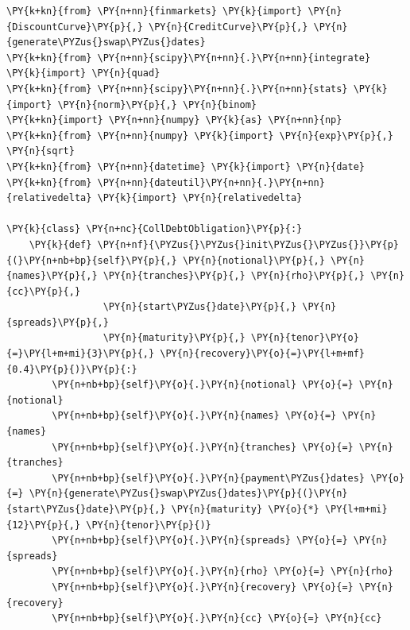 \begin{codebox}
\begin{Verbatim}[commandchars=\\\{\}]
\PY{k+kn}{from} \PY{n+nn}{finmarkets} \PY{k}{import} \PY{n}{DiscountCurve}\PY{p}{,} \PY{n}{CreditCurve}\PY{p}{,} \PY{n}{generate\PYZus{}swap\PYZus{}dates}
\PY{k+kn}{from} \PY{n+nn}{scipy}\PY{n+nn}{.}\PY{n+nn}{integrate} \PY{k}{import} \PY{n}{quad}
\PY{k+kn}{from} \PY{n+nn}{scipy}\PY{n+nn}{.}\PY{n+nn}{stats} \PY{k}{import} \PY{n}{norm}\PY{p}{,} \PY{n}{binom}
\PY{k+kn}{import} \PY{n+nn}{numpy} \PY{k}{as} \PY{n+nn}{np}
\PY{k+kn}{from} \PY{n+nn}{numpy} \PY{k}{import} \PY{n}{exp}\PY{p}{,} \PY{n}{sqrt}
\PY{k+kn}{from} \PY{n+nn}{datetime} \PY{k}{import} \PY{n}{date}
\PY{k+kn}{from} \PY{n+nn}{dateutil}\PY{n+nn}{.}\PY{n+nn}{relativedelta} \PY{k}{import} \PY{n}{relativedelta}
	
\PY{k}{class} \PY{n+nc}{CollDebtObligation}\PY{p}{:}
    \PY{k}{def} \PY{n+nf}{\PYZus{}\PYZus{}init\PYZus{}\PYZus{}}\PY{p}{(}\PY{n+nb+bp}{self}\PY{p}{,} \PY{n}{notional}\PY{p}{,} \PY{n}{names}\PY{p}{,} \PY{n}{tranches}\PY{p}{,} \PY{n}{rho}\PY{p}{,} \PY{n}{cc}\PY{p}{,}
                 \PY{n}{start\PYZus{}date}\PY{p}{,} \PY{n}{spreads}\PY{p}{,}
                 \PY{n}{maturity}\PY{p}{,} \PY{n}{tenor}\PY{o}{=}\PY{l+m+mi}{3}\PY{p}{,} \PY{n}{recovery}\PY{o}{=}\PY{l+m+mf}{0.4}\PY{p}{)}\PY{p}{:}
        \PY{n+nb+bp}{self}\PY{o}{.}\PY{n}{notional} \PY{o}{=} \PY{n}{notional}
        \PY{n+nb+bp}{self}\PY{o}{.}\PY{n}{names} \PY{o}{=} \PY{n}{names}
        \PY{n+nb+bp}{self}\PY{o}{.}\PY{n}{tranches} \PY{o}{=} \PY{n}{tranches}
        \PY{n+nb+bp}{self}\PY{o}{.}\PY{n}{payment\PYZus{}dates} \PY{o}{=} \PY{n}{generate\PYZus{}swap\PYZus{}dates}\PY{p}{(}\PY{n}{start\PYZus{}date}\PY{p}{,} \PY{n}{maturity} \PY{o}{*} \PY{l+m+mi}{12}\PY{p}{,} \PY{n}{tenor}\PY{p}{)}
        \PY{n+nb+bp}{self}\PY{o}{.}\PY{n}{spreads} \PY{o}{=} \PY{n}{spreads}
        \PY{n+nb+bp}{self}\PY{o}{.}\PY{n}{rho} \PY{o}{=} \PY{n}{rho}
        \PY{n+nb+bp}{self}\PY{o}{.}\PY{n}{recovery} \PY{o}{=} \PY{n}{recovery}
        \PY{n+nb+bp}{self}\PY{o}{.}\PY{n}{cc} \PY{o}{=} \PY{n}{cc}
	

\end{Verbatim}
\end{codebox}
